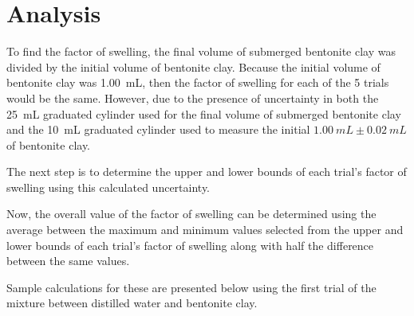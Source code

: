 \documentclass[11pt, letterpaper]{article}
\begin{document}
\section{Analysis}

To find the factor of swelling, the final volume of submerged
bentonite clay was divided by the initial volume of bentonite clay.
Because the initial volume of bentonite clay was \SI{1.00}{mL}, then
the factor of swelling for each of the 5 trials would be the same.
However, due to the presence of uncertainty in both the \SI{25}{mL}
graduated cylinder used for the final volume of submerged bentonite clay
and the \SI{10}{mL} graduated cylinder used to measure the initial
\(\SI{1.00}{mL} \pm \SI{0.02}{mL}\) of bentonite clay.

The next step is to determine the upper and lower bounds of each trial's factor of swelling
using this calculated uncertainty.

Now, the overall value of the factor of swelling can be determined
using the average between the maximum and minimum values selected
from the upper and lower bounds of each trial's factor of swelling
along with half the difference between the same values.

Sample calculations for these are presented below
using the first trial
of the mixture between distilled water and bentonite clay.
\end{document}
